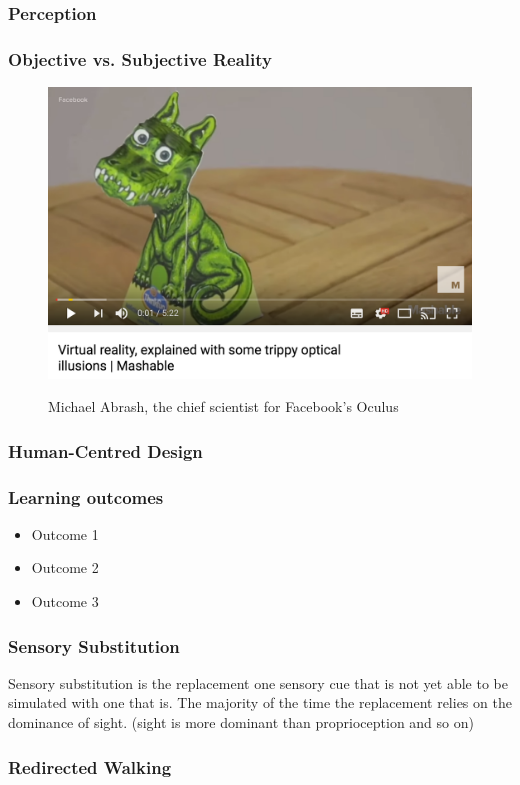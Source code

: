 \begin{frame}
	\frametitle{Perception}
\end{frame}

\begin{frame}
	\frametitle{Objective vs. Subjective Reality}
	
\end{frame}


\begin{frame}
	\begin{figure}
		\href{https://www.youtube.com/watch?v=qD3w3cAhEYU}{ \includegraphics[scale=.4]{assets/optical}  }
		\caption{Michael Abrash, the chief scientist for Facebook's Oculus}
	\end{figure}
\end{frame}

\begin{frame}
	\frametitle{Human-Centred Design}
	
\end{frame}

\begin{frame}
	\frametitle{Learning outcomes}
	\begin{itemize}
		\item Outcome 1
		\item Outcome 2
		\item Outcome 3
	\end{itemize}
\end{frame}

\begin{frame}
	\frametitle{Sensory Substitution}
	Sensory substitution is the replacement one sensory cue that is not yet able to be simulated with one that is. The majority of the time the replacement relies on the dominance of sight. (sight is more dominant than proprioception and so on)

\end{frame}


\begin{frame}
	\frametitle{Redirected Walking}
\end{frame}


